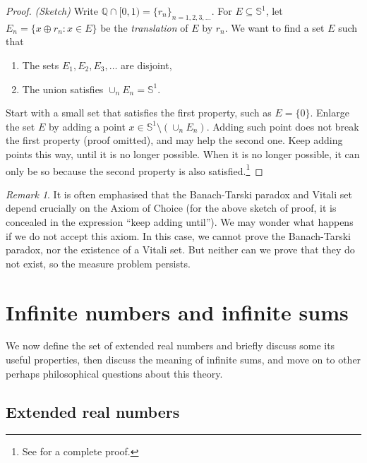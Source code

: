 \documentclass[
]{book}
\newcommand{\Q}{\mathbb{Q}}
\newcommand{\SSS}{\mathbb{S}}
\theoremstyle{definition}
\theoremstyle{definition}
\theoremstyle{definition}
\theoremstyle{definition}
\theoremstyle{remark}
\newtheorem*{remark}{Remark}
\begin{document}
\begin{proof}
\emph{(Sketch)} Write \(\Q \cap [0,1) = \{r_n\}_{n=1,2,3,\dots}\). For
\(E \subseteq \SSS^1\), let \(E_n = \{ x \oplus r_n : x \in E \}\) be the
\emph{translation} of \(E\) by \(r_n\). We want to find a set \(E\) such that

\begin{enumerate}
\def\labelenumi{\arabic{enumi}.}
\item
  The sets \(E_1,E_2,E_3,\dots\) are disjoint,
\item
  The union satisfies \(\cup_n E_n = \SSS^1\).
\end{enumerate}

Start with a small set that satisfies the first property, such as
\(E = \{0\}\). Enlarge the set \(E\) by adding a point
\(x \in \SSS^1 \setminus (\cup_n E_n)\). Adding such point does not break
the first property (proof omitted), and may help the second one. Keep
adding points this way, until it is no longer possible. When it is no
longer possible, it can only be so because the second property is also
satisfied.\footnote{See \citep[ 1.4.9]{Cohn13} for a complete proof.}
\end{proof}

\begin{remark}
It is often emphasised that the Banach-Tarski paradox and Vitali set
depend crucially on the Axiom of Choice (for the above sketch of proof,
it is concealed in the expression ``keep adding until''). We may wonder
what happens if we do not accept this axiom. In this case, we cannot
prove the Banach-Tarski paradox, nor the existence of a Vitali set. But
neither can we prove that they do not exist, so the measure problem
persists.
\end{remark}

\hypertarget{sub:infinitenumbers}{%
\section{Infinite numbers and infinite sums}\label{sub:infinitenumbers}}

We now define the set of extended real numbers and briefly discuss some
its useful properties, then discuss the meaning of infinite sums, and
move on to other perhaps philosophical questions about this theory.

\hypertarget{subsub:extended}{%
\subsection{Extended real numbers}\label{subsub:extended}}
\end{document}
